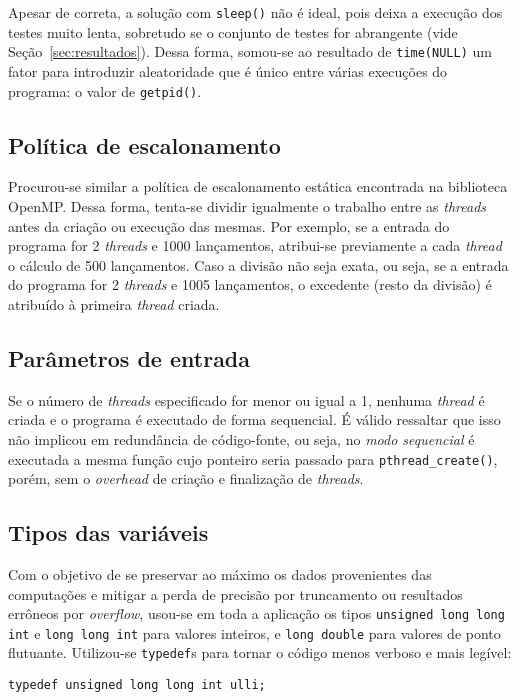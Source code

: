 \documentclass[12pt,a4paper]{article}
\begin{document}
Apesar de correta, a solução com \texttt{sleep()} não é ideal, pois deixa a
execução dos testes muito lenta, sobretudo se o conjunto de testes for
abrangente (vide Seção~\ref{sec:resultados}). Dessa forma, somou-se ao resultado
de \texttt{time(NULL)} um fator para introduzir aleatoridade que é único entre
várias execuções do programa: o valor de \texttt{getpid()}.

\subsection{Política de escalonamento}
Procurou-se similar a política de escalonamento estática encontrada na
biblioteca OpenMP.  Dessa forma, tenta-se dividir igualmente o trabalho entre
as \textit{threads} antes da criação ou execução das mesmas. Por exemplo, se a
entrada do programa for 2 \textit{threads} e 1000 lançamentos, atribui-se
previamente a cada \textit{thread} o cálculo de 500 lançamentos. Caso a divisão
não seja exata, ou seja, se a entrada do programa for 2 \textit{threads} e 1005
lançamentos, o excedente (resto da divisão) é atribuído à primeira
\textit{thread} criada.


\subsection{Parâmetros de entrada}
Se o número de \textit{threads} especificado for menor ou igual a 1, nenhuma
\textit{thread} é criada e o programa é executado de forma sequencial. É válido
ressaltar que isso não implicou em redundância de código-fonte, ou seja, no
\emph{modo sequencial} é executada a mesma função cujo ponteiro seria passado
para \texttt{pthread\_create()}, porém, sem o \textit{overhead} de criação e
finalização de \textit{threads}.


\subsection{Tipos das variáveis}
Com o objetivo de se preservar ao máximo os dados provenientes das computações
e mitigar a perda de precisão por truncamento ou resultados errôneos por
\textit{overflow}, usou-se em toda a aplicação os tipos \texttt{unsigned long
long int} e \texttt{long long int} para valores inteiros, e \texttt{long
double} para valores de ponto flutuante. Utilizou-se \texttt{typedef}s para tornar o código menos verboso e mais 
legível:

\begin{verbatim}
typedef unsigned long long int ulli;
\end{verbatim}
\end{document}
